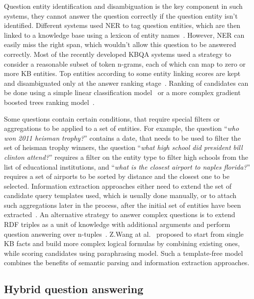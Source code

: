 Question entity identification and disambiguation is the key component in such systems, they cannot answer the question correctly if the question entity isn't identified.
Different systems used NER to tag question entities, which are then linked to a knowledge base using a lexicon of entity names~\cite{BerantCFL13:sempre,BerantL14:parasempre,xu2014answering}.
However, NER can easily miss the right span, which wouldn't allow this question to be answered correctly.
Most of the recently developed KBQA systems used a strategy to consider a reasonable subset of token n-grams, each of which can map to zero or more KB entities.
Top entities according to some entity linking scores are kept and disambiguated only at the answer ranking stage~\cite{yao-scratch-qa-naacl2015,bastmore:cikm:2015:aquu,yih:ACL:2015:STAGG}.
Ranking of candidates can be done using a simple linear classification model~\cite{yao-scratch-qa-naacl2015} or a more complex gradient boosted trees ranking model~\cite{bastmore:cikm:2015:aquu,yih:ACL:2015:STAGG}.

Some questions contain certain conditions, that require special filters or aggregations to be applied to a set of entities. 
For example, the question ``\textit{who won 2011 heisman trophy?}'' contains a date, that needs to be used to filter the set of heisman trophy winners, the question ``\textit{what high school did president bill clinton attend?}'' requires a filter on the entity type to filter high schools from the list of educational institutions, and ``\textit{what is the closest airport to naples florida?}'' requires a set of airports to be sorted by distance and the closest one to be selected.
Information extraction approaches either need to extend the set of candidate query templates used, which is usually done manually, or to attach such aggregations later in the process, after the initial set of entities have been extracted~\cite{yih:ACL:2015:STAGG,xu2016enhancing}.
An alternative strategy to answer complex questions is to extend RDF triples as a unit of knowledge with additional arguments and perform question answering over n-tuples~\cite{yin2015answering}.
Z.Wang at al.~\cite{wang2015large} proposed to start from single KB facts and build more complex logical formulas by combining existing ones, while scoring candidates using paraphrasing model.
Such a template-free model combines the benefits of semantic parsing and information extraction approaches.

\subsection{Hybrid question answering}
\label{section:relatedwork:factoid:hybrid}

